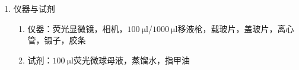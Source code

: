 \documentclass[a4paper]{article}
\begin{document}
\begin{enumerate}[label=\chinese*.,left=0pt]
\begin{enumerate}[label=\arabic*.,left = 0pt]
        \item 布朗运动的高斯分布：考虑粒子从原点出发，经历 $n$ 步后位于 $x$ 的概率是
        $$P(x) = \binom{n}{\frac{n}{2}+\frac{x}{2\delta}} =\frac{n!}{\left(\frac{n}{2}+\frac{x}{2\delta}\right)! \left( \frac{n}{2}-\frac{x}{2\delta}\right)!}.$$
        $n$ 较大时，使用斯特林近似，
        \begin{align*}
            \ln{P(x)} & \approx n\ln n - \left(\frac{n}{2}+\frac{x}{2\delta}\right) \ln{\left(\frac{n}{2}+\frac{x}{2\delta}\right)}- \left(\frac{n}{2}-\frac{x}{2\delta}\right) \ln{\left(\frac{n}{2}-\frac{x}{2\delta}\right)} \\
            & = -\frac{n}{2}\ln{\left(1-\frac{x^2}{n^2\delta^2}\right)}+\frac{x}{2\delta}\ln \left(1-\frac{2x}{n\delta+x}\right)+n\ln 2 \\
            & \approx \frac{x^2}{2n\delta^2}-\frac{x^2}{n\delta^2}+n\ln 2 \\
            & = -\frac{x^2}{2n\delta^2}+n\ln2 
        \end{align*}
        故 $P(x) \propto \exp{\left(-\frac{x^2}{2n\delta^2}\right)}=\exp{\left(-\frac{x^2}{4Dt}\right)}$，即符合高斯分布。进一步归一化得到
        $$P(x) = \frac{1}{(4\pi Dt)^{1/2}}e^{-\frac{x^2}{4Dt}}.$$
        对于二维布朗运动，由于粒子在两个方向上的运动独立，故
        $$P(x,y) = P(x) \cdot P(y) = \frac{1}{4\pi D t} e^{-\frac{x^2+y^2}{4Dt}} = \frac{1}{4\pi Dt} e^{-\frac{r^2}{4Dt}}$$

        \item 玻尔兹曼常数和阿伏伽德罗常数：由理想气体方程立即得到
        $$PV=nRT = kN_\text{A}T \implies N_\text{A} =\frac{R}{k}.$$
    \end{enumerate}
    
    \item 仪器与试剂
    \begin{enumerate}[label=\arabic*.,left = 0pt]
        \item 仪器：荧光显微镜，相机，$\qty{100}{\micro \litre}$/$\qty{1000}{\micro \litre}$移液枪，载玻片，盖玻片，离心管，镊子，胶条
        \item 试剂：$\qty{100}{\micro \litre}$荧光微球母液，蒸馏水，指甲油
    \end{enumerate}


\end{enumerate}
\end{document}
